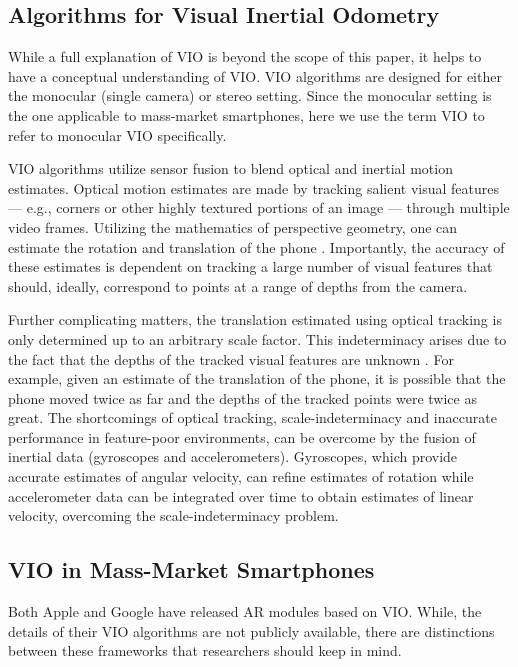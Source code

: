\documentclass[chi_draft]{sigchi}
\begin{document}
\subsection{Algorithms for Visual Inertial Odometry}
While a full explanation of VIO \cite{gui2015review} is beyond the scope of this paper, it helps to have a conceptual understanding of VIO.  VIO algorithms are designed for either the monocular (single camera) or stereo setting.  Since the monocular setting is the one applicable to mass-market smartphones, here we use the term VIO to refer to monocular VIO specifically.

VIO algorithms utilize sensor fusion to blend optical and inertial motion estimates.  Optical motion estimates are made by tracking salient visual features --- e.g., corners or other highly textured portions of an image --- through multiple video frames.  Utilizing the mathematics of perspective geometry, one can estimate the rotation and translation of the phone \cite{Hartley2004}.  Importantly, the accuracy of these estimates is dependent on tracking a large number of visual features that should, ideally, correspond to points at a range of depths from the camera.%

Further complicating matters, the translation estimated using optical tracking is only determined up to an arbitrary scale factor.  This indeterminacy arises due to the fact that the depths of the tracked visual features are unknown \cite{Hartley2004}.  For example, given an estimate of the translation of the phone, it is possible that the phone moved twice as far and the depths of the tracked points were twice as great.  The shortcomings of optical tracking, scale-indeterminacy and inaccurate performance in feature-poor environments, can be overcome by the fusion of inertial data (gyroscopes and accelerometers).  Gyroscopes, which provide accurate estimates of angular velocity, can refine estimates of rotation while accelerometer data can be integrated over time to obtain estimates of linear velocity, overcoming the scale-indeterminacy problem.%

\subsection{VIO in Mass-Market Smartphones}
Both Apple and Google have released AR modules based on VIO.  While, the details of their VIO algorithms are not publicly available, there are distinctions between these frameworks that researchers should keep in mind.
\end{document}
